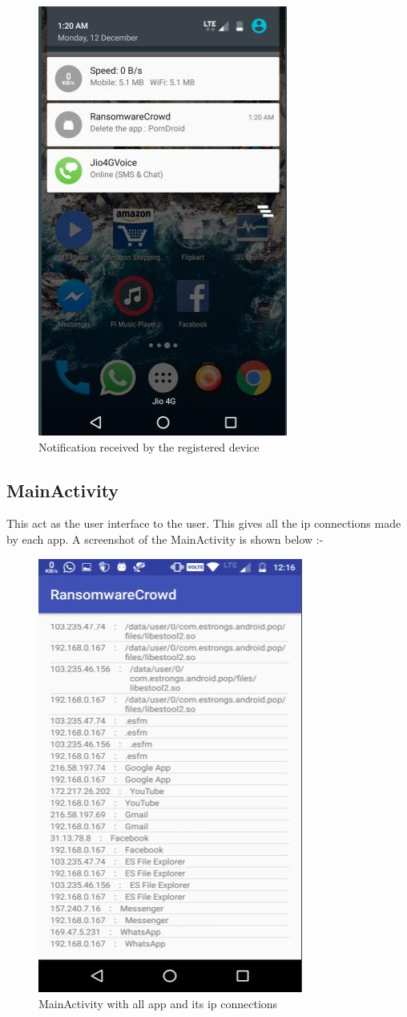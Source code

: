 \begin{figure}[H]
\centering
\includegraphics[scale=0.8]{notify}
\caption{Notification received by the registered device}
\label{fig:ra}
\end{figure}

\clearpage

\subsection{MainActivity}

\par This act as the user interface to the user.
This gives all the ip connections made by each app.
A screenshot of the MainActivity is shown below :-

\begin{figure}[H]
\centering
\includegraphics[scale=0.8]{front}
\caption{MainActivity with all app and its ip connections}
\label{fig:ra}
\end{figure}




